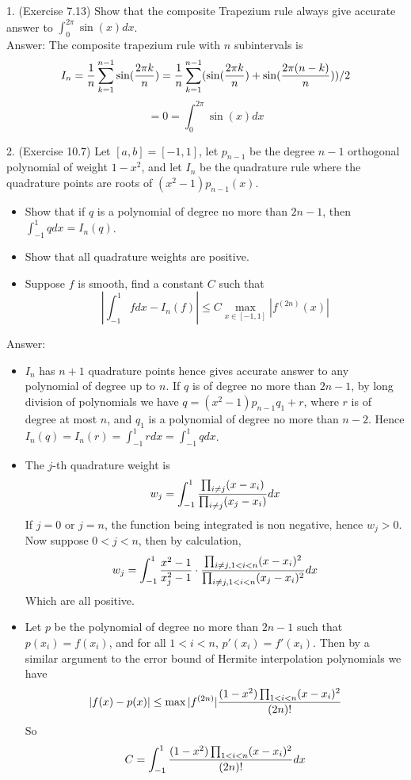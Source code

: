 \documentclass{article} %
\theoremstyle{break}
\begin{document}
1. (Exercise 7.13) Show that the composite Trapezium rule always give accurate answer to $\int_0^{2\pi}\sin(x)dx$.\\  

Answer: The composite trapezium rule with $n$ subintervals is
\[I_n={1\over n}\sum_{k=1}^{n-1}\sin({2\pi k\over n})={1\over n}\sum_{k=1}^{n-1}(\sin({2\pi k\over n})+\sin({2\pi(n-k)\over n}))/2\]
\[=0=\int_0^{2\pi}\sin(x)dx\]

2. (Exercise 10.7) Let $[a, b]=[-1, 1]$, let $p_{n-1}$ be the degree $n-1$ orthogonal polynomial of weight $1-x^2$, and let $I_n$ be the quadrature rule where the quadrature points are roots of $(x^2-1)p_{n-1}(x)$.
\begin{itemize}
\item Show that if $q$ is a polynomial of degree no more than $2n-1$, then $\int_{-1}^1qdx=I_n(q)$.
\item Show that all quadrature weights are positive.
\item Suppose $f$ is smooth, find a constant $C$ such that
  \[|\int_{-1}^1fdx-I_n(f)|\leq C\max_{x\in [-1, 1]}|f^{(2n)}(x)|\]
\end{itemize}

Answer:\\

\begin{itemize}
\item $I_n$ has $n+1$ quadrature points hence gives accurate answer to any polynomial of degree up to $n$. If $q$ is of degree no more than $2n-1$, by long division of polynomials we have $q=(x^2-1)p_{n-1}q_1+r$, where $r$ is of degree at most $n$, and $q_1$ is a polynomial of degree no more than $n-2$. Hence $I_n(q)=I_n(r)=\int_{-1}^1rdx=\int_{-1}^1qdx$.  
\item The $j$-th quadrature weight is
  \[w_j=\int_{-1}^1 {\prod_{i\not=j}(x-x_i)\over \prod_{i\not=j}(x_j-x_i)}dx\]
  If $j=0$ or $j=n$, the function being integrated is non negative, hence $w_j>0$. Now suppose $0<j<n$, then by calculation,
  \[w_j=\int_{-1}^1{x^2-1\over x_j^2-1}\cdot {\prod_{i\not=j, 1<i<n}(x-x_i)^2\over \prod_{i\not=j, 1<i<n}(x_j-x_i)^2}dx\]
  Which are all positive.
\item Let $p$ be the polynomial of degree no more than $2n-1$ such that $p(x_i)=f(x_i)$, and for all $1<i<n$, $p'(x_i)=f'(x_i)$. Then by a similar argument to the error bound of Hermite interpolation polynomials we have
  \[|f(x)-p(x)|\leq \max|f^{(2n)}|{(1-x^2)\prod_{1<i<n}(x-x_i)^2\over (2n)!}\]
  So
  \[C=\int_{-1}^1 {(1-x^2)\prod_{1<i<n}(x-x_i)^2\over (2n)!}dx\]
\end{itemize}
\end{document}
